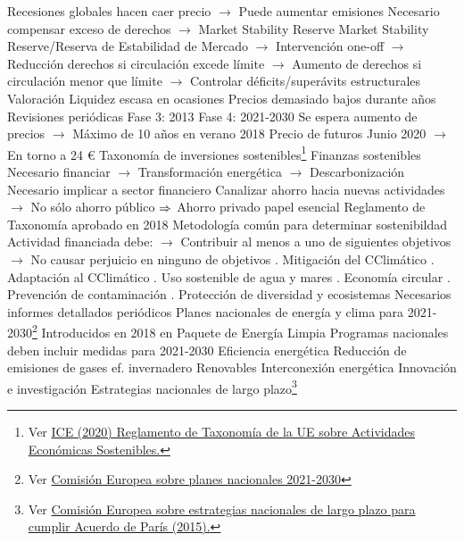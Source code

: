 \documentclass{nuevotema}
\begin{document}
\begin{esquemal}
				\4[] Recesiones globales hacen caer precio
				\4[] $\to$ Puede aumentar emisiones
				\4[] Necesario compensar exceso de derechos
				\4[] $\to$ Market Stability Reserve
				\4[] Market Stability Reserve/Reserva de Estabilidad de Mercado
				\4[] $\to$ Intervención one-off
				\4[] $\to$ Reducción derechos si circulación excede límite
				\4[] $\to$ Aumento de derechos si circulación menor que límite
				\4[] $\to$ Controlar déficits/superávits estructurales
				\4 Valoración
				\4[] Liquidez escasa en ocasiones
				\4[] Precios demasiado bajos durante años
				\4[] Revisiones periódicas
				\4[] Fase 3: 2013
				\4[] Fase 4: 2021-2030
				\4[] Se espera aumento de precios
				\4[] $\to$ Máximo de 10 años en verano 2018
				\4[] Precio de futuros Junio 2020
				\4[] $\to$ En torno a 24 €
			\3 Taxonomía de inversiones sostenibles\footnote{Ver \href{http://www.revistasice.com/index.php/BICE/article/view/7077/7076}{ICE (2020) Reglamento de Taxonomía de la UE sobre Actividades Económicas Sostenibles.}}
				\4 Finanzas sostenibles
				\4[] Necesario financiar
				\4[] $\to$ Transformación energética
				\4[] $\to$ Descarbonización
				\4 Necesario implicar a sector financiero
				\4[] Canalizar ahorro hacia nuevas actividades
				\4[] $\to$ No sólo ahorro público
				\4[] $\Rightarrow$ Ahorro privado papel esencial
				\4 Reglamento de Taxonomía aprobado en 2018
				\4 Metodología común para determinar sostenibildad
				\4 Actividad financiada debe:
				\4[] $\to$ Contribuir al menos a uno de siguientes objetivos
				\4[] $\to$ No causar perjuicio en ninguno de objetivos
				. Mitigación del CClimático
				. Adaptación al CClimático
				. Uso sostenible de agua y mares
				. Economía circular
				. Prevención de contaminación
				. Protección de diversidad y ecosistemas
				\4 Necesarios informes detallados periódicos
			\3 Planes nacionales de energía y clima para 2021-2030\footnote{Ver \href{https://ec.europa.eu/info/energy-climate-change-environment/overall-targets/national-energy-and-climate-plans-necps_en}{Comisión Europea sobre planes nacionales 2021-2030}}
				\4 Introducidos en 2018 en Paquete de Energía Limpia
				\4 Programas nacionales deben incluir medidas para 2021-2030
				\4[] Eficiencia energética
				\4[] Reducción de emisiones de gases ef. invernadero
				\4[] Renovables
				\4[] Interconexión energética
				\4[] Innovación e investigación
			\3 Estrategias nacionales de largo plazo\footnote{Ver \href{https://ec.europa.eu/info/energy-climate-change-environment/overall-targets/long-term-strategies_en}{Comisión Europea sobre estrategias nacionales de largo plazo para cumplir Acuerdo de París (2015).}}

\end{esquemal}
\end{document}
